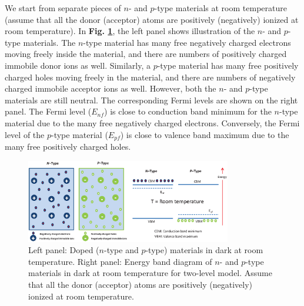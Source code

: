 \documentclass[a4paper, 12pt, titlepage,oneside,drop]{kthesis}
\begin{document}
We start from separate pieces of $n$- and $p$-type materials at room temperature (assume that all the donor (acceptor) atoms are positively (negatively) ionized at room temperature). In \textbf{Fig. \ref{dopedmaterials}},
the left panel shows illustration of the $n$- and $p$-type materials. The $n$-type
material has many free negatively charged electrons moving freely inside the material, and there are numbers of positively charged immobile donor ions as well. Similarly, a $p$-type material has many free positively
charged holes moving freely in the material, and there are numbers of negatively charged immobile acceptor ions as well. However, both the $n$- and $p$-type materials are still neutral.
The corresponding Fermi levels are shown on the right panel. The Fermi level ($E_{nf}$) is close to conduction band minimum for the $n$-type material due to the many free 
negatively charged electrons. Conversely, the Fermi level of the $p$-type material ($E_{pf}$) is close to valence band maximum due to the many free positively charged holes.

\begin{figure}[H]
    \begin{center}
            \includegraphics[width=0.8\textwidth,clip]{sepratepn.eps}
     \end{center}
    \caption{Left panel: Doped ($n$-type and $p$-type) materials in dark at room temperature. Right panel: Energy band diagram of $n$- and $p$-type materials in dark at room temperature for two-level model. Assume that all the donor (acceptor) atoms are 
    positively (negatively) ionized at room temperature.}      
    \label{dopedmaterials}
\end{figure}
\end{document}
